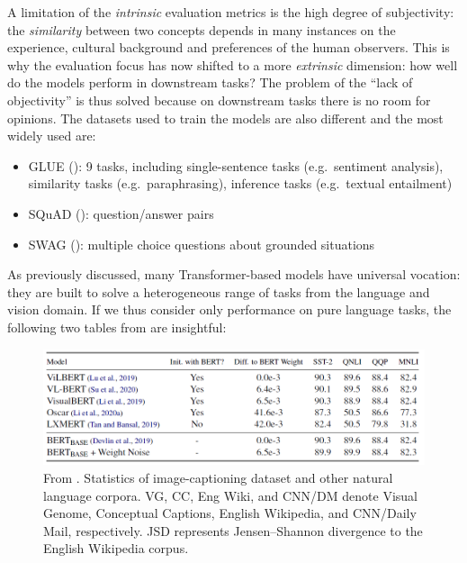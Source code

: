 \documentclass[
]{krantz}
\providecommand{\tightlist}{%
  \setlength{\itemsep}{0pt}\setlength{\parskip}{0pt}}
\begin{document}
A limitation of the \emph{intrinsic} evaluation metrics is the high degree of subjectivity: the \emph{similarity} between two concepts depends in many instances on the experience, cultural background and preferences of the human observers. This is why the evaluation focus has now shifted to a more \emph{extrinsic} dimension: how well do the models perform in downstream tasks? The problem of the ``lack of objectivity'' is thus solved because on downstream tasks there is no room for opinions. The datasets used to train the models are also different and the most widely used are:

\begin{itemize}
\tightlist
\item
  GLUE (\citet{wang2018glue}): 9 tasks, including single-sentence tasks (e.g.~sentiment analysis), similarity tasks (e.g.~paraphrasing), inference tasks (e.g.~textual entailment)
\item
  SQuAD (\citet{rajpurkar2016squad}): question/answer pairs
\item
  SWAG (\citet{zellers2018swag}): multiple choice questions about grounded situations
\end{itemize}

As previously discussed, many Transformer-based models have universal vocation: they are built to solve a heterogeneous range of tasks from the language and vision domain. If we thus consider only performance on pure language tasks, the following two tables from \citet{tan2020vokenization} are insightful:

\begin{figure}

{\centering \includegraphics[width=1\linewidth]{figures/02-03-img-support-text/img-tan2020-02} 

}

\caption{From \citet{tan2020vokenization}. Statistics of image-captioning dataset and other natural language corpora. VG, CC, Eng Wiki, and CNN/DM denote Visual Genome, Conceptual Captions, English Wikipedia, and CNN/Daily Mail, respectively. JSD represents Jensen--Shannon divergence to the English Wikipedia corpus.}\label{fig:img-tan2020-02}
\end{figure}
\end{document}
